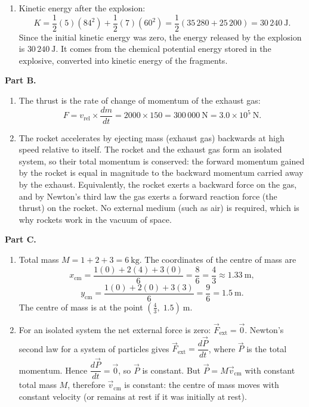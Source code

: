 \documentclass[11pt]{article}
\begin{document}
\begin{corrige}
\begin{enumerate}
\item Kinetic energy after the explosion:
\[ K = \frac{1}{2}(5)(84^2) + \frac{1}{2}(7)(60^2) = \frac{1}{2}(35\,280 + 25\,200) = 30\,240\ \mathrm{J}. \]
Since the initial kinetic energy was zero, the energy released by the explosion is $30\,240\ \mathrm{J}$. It comes from the chemical potential energy stored in the explosive, converted into kinetic energy of the fragments.
\end{enumerate}

\textbf{Part B.}
\begin{enumerate}
\item[(c)] The thrust is the rate of change of momentum of the exhaust gas:
\[ F = v_{\mathrm{rel}} \times \frac{dm}{dt} = 2000 \times 150 = 300\,000\ \mathrm{N} = 3.0 \times 10^5\ \mathrm{N}. \]

\item[(d)] The rocket accelerates by ejecting mass (exhaust gas) backwards at high speed relative to itself. The rocket and the exhaust gas form an isolated system, so their total momentum is conserved: the forward momentum gained by the rocket is equal in magnitude to the backward momentum carried away by the exhaust. Equivalently, the rocket exerts a backward force on the gas, and by Newton's third law the gas exerts a forward reaction force (the thrust) on the rocket. No external medium (such as air) is required, which is why rockets work in the vacuum of space.
\end{enumerate}

\textbf{Part C.}
\begin{enumerate}
\item[(e)] Total mass $M = 1+2+3 = 6\ \mathrm{kg}$. The coordinates of the centre of mass are
\[ x_{\mathrm{cm}} = \frac{1(0) + 2(4) + 3(0)}{6} = \frac{8}{6} = \frac{4}{3} \approx 1.33\ \mathrm{m}, \]
\[ y_{\mathrm{cm}} = \frac{1(0) + 2(0) + 3(3)}{6} = \frac{9}{6} = 1.5\ \mathrm{m}. \]
The centre of mass is at the point $\left(\frac{4}{3},\; 1.5\right)\ \mathrm{m}$.

\item[(f)] For an isolated system the net external force is zero: $\vec{F}_{\mathrm{ext}} = \vec{0}$. Newton's second law for a system of particles gives $\vec{F}_{\mathrm{ext}} = \dfrac{d\vec{P}}{dt}$, where $\vec{P}$ is the total momentum. Hence $\dfrac{d\vec{P}}{dt} = \vec{0}$, so $\vec{P}$ is constant. But $\vec{P} = M\vec{v}_{\mathrm{cm}}$ with constant total mass $M$, therefore $\vec{v}_{\mathrm{cm}}$ is constant: the centre of mass moves with constant velocity (or remains at rest if it was initially at rest).
\end{enumerate}
\end{corrige}
\end{document}
